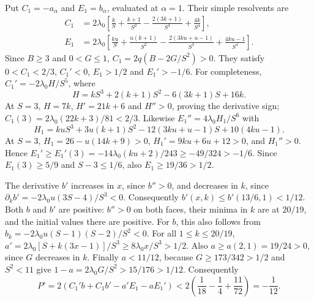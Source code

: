 Put $C_1=-a_\alpha$ and $E_1=b_\alpha$, evaluated at $\alpha=1$. Their simple resolvents are
\begin{align*}
 C_1&=2\lambda_0\left[\frac{k}{S}+\frac{k+1}{S^2}
                         -\frac{2(3k+1)}{S^3}+\frac{4k}{S^4}\right],\\
 E_1&=2\lambda_0\left[\frac{ku}{S}+\frac{u(k+1)}{S^2}
                  -\frac{2(3ku+u-1)}{S^3}+\frac{4ku-1}{S^4}\right].
\end{align*}
Since $B\ge3$ and $0<G\le1$, $C_1=2q(B-2G/S^2)>0$.
They satisfy $0<C_1<2/3$, $C_1'<0$, $E_1>1/2$ and $E_1'>-1/6$.
For completeness, $C_1'=-2\lambda_0H/S^5$, where
\[
 H=kS^3+2(k+1)S^2-6(3k+1)S+16k.
\]
At $S=3$, $H=7k$, $H'=21k+6$ and $H''>0$, proving the derivative sign;
$C_1(3)=2\lambda_0(22k+3)/81<2/3$.
Likewise $E_1''=4\lambda_0H_1/S^6$ with
\[
 H_1=kuS^3+3u(k+1)S^2-12(3ku+u-1)S+10(4ku-1).
\]
At $S=3$, $H_1=26-u(14k+9)>0$, $H_1'=9ku+6u+12>0$, and $H_1''>0$.
Hence $E_1'\ge E_1'(3)=-14\lambda_0(ku+2)/243\ge-49/324>-1/6$.
Since $E_1(3)\ge5/9$ and $S-3\le1/6$, also $E_1\ge19/36>1/2$.

The derivative $b'$ increases in $x$, since $b''>0$, and decreases in $k$, since
$\partial_k b'=-2\lambda_0u(3S-4)/S^3<0$.
Consequently $b'(x,k)\le b'(13/6,1)<1/12$.
Both $b$ and $b'$ are positive: $b''>0$ on both faces, their minima in $k$ are
at $20/19$, and the initial values there are positive. For $b$, this also follows from
$b_k=-2\lambda_0u(S-1)(S-2)/S^2<0$.
For all $1\le k\le20/19$,
$a'=2\lambda_0[S+k(3x-1)]/S^3\ge8\lambda_0x/S^3>1/2$.
Also $a\ge a(2,1)=19/24>0$, since $G$ decreases in $k$.
Finally $a<11/12$, because $G\ge173/342>1/2$ and $S^2<11$ give
$1-a=2\lambda_0G/S^2>15/176>1/12$.
Consequently
\[
 P'=2(C_1'b+C_1b'-a'E_1-aE_1')
 <2\left(\frac1{18}-\frac14+\frac{11}{72}\right)=-\frac1{12}.
\]

